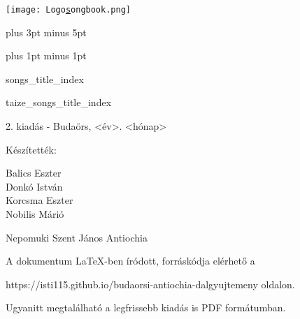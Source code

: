 \documentclass[a5paper,twoside]{article}
\renewcommand{\_}[1]{\underline{#1}}
\begin{document}
  \begin{titlepage}
    \thispagestyle{empty}

    \vspace*{1.3cm}
    \texttt{[image: Logo\_songbook.png]}

  \end{titlepage}

  \renewcommand{\idxtitlefont}{\sffamily}
  \renewcommand{\idxlyricfont}{\rmfamily\slshape}

  \versesep=12pt plus 3pt minus 5pt

  \iflyric
    \baselineadj=2pt plus 1pt minus 1pt
  \fi

  \begin{songs}{songs_title_index}
    
    
  \end{songs}

  \begin{songs}{taize_songs_title_index}
    
  \end{songs}

  \begin{songs}{}
    
  \end{songs}

  \begin{songs}{}
    
  \end{songs}

  \ifodd \value{page}
    \newpage
    \thispagestyle{empty}
    \null
  \else \fi

  \newpage
  \thispagestyle{empty}

  \vspace*{\fill}
  \setlength{\parindent}{0pt}

  2. kiadás - Budaörs, <év>. <hónap>

  \vspace{0.3cm}

  Készítették:
  \vspace{-0.3cm}
  \begin{multicols}{3}
    Balics Eszter \\
    Donkó István \\
    Korcsma Eszter \\
    Nobilis Márió \\
  \end{multicols}

  Nepomuki Szent János Antiochia

  \vspace{0.3cm}

  A dokumentum LaTeX-ben íródott, forráskódja elérhető a

  https://isti115.github.io/budaorsi-antiochia-dalgyujtemeny oldalon.

  Ugyanitt megtalálható a legfrissebb kiadás is PDF formátumban.
\end{document}
